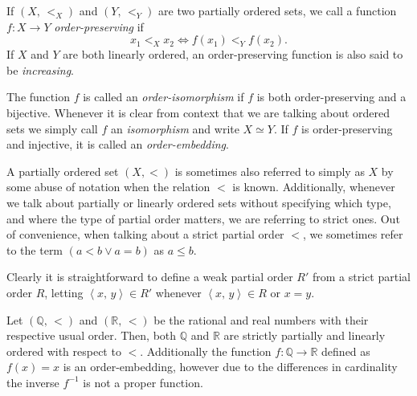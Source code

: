 \documentclass[../../main.tex]{subfiles}
\begin{document}
\begin{definition}\cite[p.13]{Jec78}
    If $\left(X,\, <_X\right)$ and $\left(Y,\, <_Y\right)$ are two partially ordered sets, we call a function $f: X \to Y$ \textit{order-preserving} if
    $$x_1 <_X x_2 \iff f(x_1) <_Y f(x_2).$$
    If $X$ and $Y$ are both linearly ordered, an order-preserving function is also said to be \textit{increasing}.

    The function $f$ is called an \textit{order-isomorphism} if $f$ is both order-preserving and a bijective.
    Whenever it is clear from context that we are talking about ordered sets we simply call $f$ an \textit{isomorphism} and write $X \simeq Y$.
    If $f$ is order-preserving and injective, it is called an \textit{order-embedding}. \cite[p.167]{Gol17}
\end{definition}

A partially ordered set $(X, <)$ is sometimes also referred to simply as $X$ by some abuse of notation when the relation $<$ is known.
Additionally, whenever we talk about partially or linearly ordered sets without specifying which type, and where the type of partial order matters, we are referring to strict ones. \cite[p.12]{Jec78}
Out of convenience, when talking about a strict partial order $<$, we sometimes refer to the term $\left(a < b \vee a = b\right)$ as $a \leq b$.

Clearly it is straightforward to define a weak partial order $R'$ from a strict partial order $R$, letting $\left<x,\, y\right> \in R'$ whenever $\left<x,\, y\right> \in R$ or $x = y$.

\begin{example}
        Let $(\mathbb{Q},\, <)$ and $(\mathbb{R},\, <)$ be the rational and real numbers with their respective usual order.
        Then, both $\mathbb{Q}$ and $\mathbb{R}$ are strictly partially and linearly ordered with respect to $<$.
        Additionally the function $f: \mathbb{Q} \to \mathbb{R}$ defined as $f(x) = x$ is an order-embedding, 
        however due to the differences in cardinality the inverse $f^{-1}$ is not a proper function.
\end{example}
\end{document}
